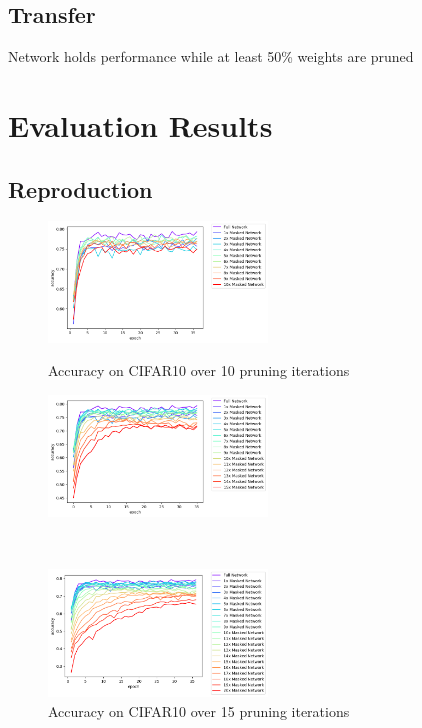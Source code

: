 \subsection*{Transfer}
Network holds performance while at least 50\% weights are pruned

\section{Evaluation Results}
\subsection*{Reproduction}
\begin{figure}
	\begin{minipage}{0.5\textwidth}
		\centering
		\includegraphics[width=220px]{gfx/Experiments/Reproduction-CIFAR10-CNN/accuracy/10_iterations.png}
		\caption*{Accuracy on CIFAR10 over 10 pruning iterations}
		\label{fig:CIFAR10accuracy10}
	\end{minipage}\hfill
	\begin{minipage}{0.5\textwidth}
		\centering
		\includegraphics[width=220px]{gfx/Experiments/Reproduction-CIFAR10-CNN/accuracy/15_iterations.png}
		\caption*{Accuracy on CIFAR10 over 15 pruning iterations}
		\label{fig:CIFAR10accuracy15}
	\end{minipage}
	\\
	\begin{minipage}{0.5\textwidth}
		\centering
		\includegraphics[width=220px]{gfx/Experiments/Reproduction-CIFAR10-CNN/accuracy/20_iterations.png}

\end{minipage}
\end{figure}
